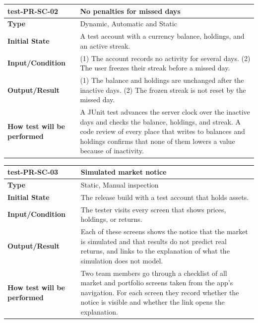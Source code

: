\documentclass[12pt, titlepage]{article}
\begin{document}
\vspace{1em}

\noindent\begin{tabularx}{\textwidth}{>{\raggedright\arraybackslash}p{3.5cm}X}
  \toprule
  \textbf{test-PR-SC-02} & \textbf{No penalties for missed days}\\
  \midrule
  \textbf{Type} & Dynamic, Automatic and Static\\
  \textbf{Initial State} & A test account with a currency balance, holdings, and an active streak.\\
  \textbf{Input/Condition} & (1) The account records no activity for several days. (2) The user freezes their streak before a missed day.\\
  \textbf{Output/Result} & (1) The balance and holdings are unchanged after the inactive days. (2) The frozen streak is not reset by the missed day.\\
  \textbf{How test will be performed} & A JUnit test advances the server clock over the inactive days and checks the balance, holdings, and streak. A code review of every place that writes to balances and holdings confirms that none of them lowers a value because of inactivity.\\
  \bottomrule
\end{tabularx}

\vspace{1em}

\noindent\begin{tabularx}{\textwidth}{>{\raggedright\arraybackslash}p{3.5cm}X}
  \toprule
  \textbf{test-PR-SC-03} & \textbf{Simulated market notice}\\
  \midrule
  \textbf{Type} & Static, Manual inspection\\
  \textbf{Initial State} & The release build with a test account that holds assets.\\
  \textbf{Input/Condition} & The tester visits every screen that shows prices, holdings, or returns.\\
  \textbf{Output/Result} & Each of these screens shows the notice that the market is simulated and that results do not predict real returns, and links to the explanation of what the simulation does not model.\\
  \textbf{How test will be performed} & Two team members go through a checklist of all market and portfolio screens taken from the app's navigation. For each screen they record whether the notice is visible and whether the link opens the explanation.\\
  \bottomrule
\end{tabularx}
\end{document}
